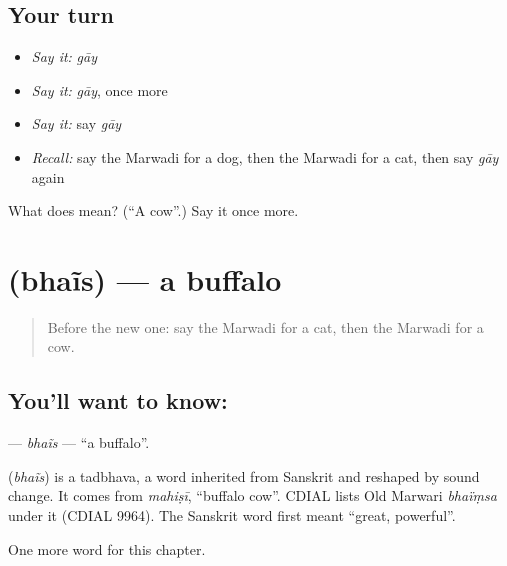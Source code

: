 \subsection*{Your turn}
\begin{itemize}
\raggedright
  \item \emph{Say it:} \emph{gāy}
  \item \emph{Say it:} \emph{gāy}, once more
  \item \emph{Say it:} say \emph{gāy}
  \item \emph{Recall:} say the Marwadi for a dog, then the Marwadi for a cat, then say \emph{gāy} again
\end{itemize}

\begin{tcolorbox}[breakable,colback=teal!4,colframe=teal!35!black,title={Before you move on}]
What does  mean? (\textquotedblleft{}A cow\textquotedblright{}.) Say it once more.
\end{tcolorbox}
\section[\texorpdfstring{\mw{भैंस} (bhaĩs)}{भैंस (bhaĩs)}]{ (bhaĩs) — a buffalo}

\label{lesson:MW-C70-bhais}



\begin{quote}
Before the new one: say the Marwadi for a cat, then the Marwadi for a cow.
\end{quote}

\subsection*{You'll want to know: }
\textbf{} — \emph{bhaĩs} — \textquotedblleft{}a buffalo\textquotedblright{}.

\begin{cousinweb}
\textbf{} (\emph{bhaĩs}) is a tadbhava, a word inherited from Sanskrit and reshaped by sound change. It comes from \emph{mahiṣī}, \textquotedblleft{}buffalo cow\textquotedblright{}. CDIAL lists Old Marwari \emph{bhaïṃsa} under it (CDIAL 9964). The Sanskrit word first meant \textquotedblleft{}great, powerful\textquotedblright{}.
\end{cousinweb}

\begin{grammarlens}[title={What you've built}]
One more word for this chapter.
\end{grammarlens}

